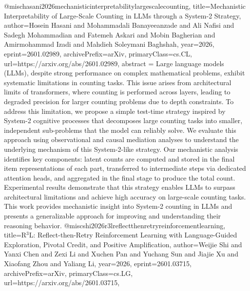 {}@misc{hasani2026mechanisticinterpretabilitylargescalecounting,
      title={Mechanistic Interpretability of Large-Scale Counting in LLMs through a System-2 Strategy}, 
      author={Hosein Hasani and Mohammadali Banayeeanzade and Ali Nafisi and Sadegh Mohammadian and Fatemeh Askari and Mobin Bagherian and Amirmohammad Izadi and Mahdieh Soleymani Baghshah},
      year={2026},
      eprint={2601.02989},
      archivePrefix={arXiv},
      primaryClass={cs.CL},
      url={https://arxiv.org/abs/2601.02989},
      abstract = {Large language models (LLMs), despite strong performance on complex mathematical problems, exhibit systematic limitations in counting tasks. This issue arises from architectural limits of transformers, where counting is performed across layers, leading to degraded precision for larger counting problems due to depth constraints. To address this limitation, we propose a simple test-time strategy inspired by System-2 cognitive processes that decomposes large counting tasks into smaller, independent sub-problems that the model can reliably solve. We evaluate this approach using observational and causal mediation analyses to understand the underlying mechanism of this System-2-like strategy. Our mechanistic analysis identifies key components: latent counts are computed and stored in the final item representations of each part, transferred to intermediate steps via dedicated attention heads, and aggregated in the final stage to produce the total count. Experimental results demonstrate that this strategy enables LLMs to surpass architectural limitations and achieve high accuracy on large-scale counting tasks. This work provides mechanistic insight into System-2 counting in LLMs and presents a generalizable approach for improving and understanding their reasoning behavior.}
}@misc{shi2026r3lreflectthenretryreinforcementlearning,
      title={R$^3$L: Reflect-then-Retry Reinforcement Learning with Language-Guided Exploration, Pivotal Credit, and Positive Amplification}, 
      author={Weijie Shi and Yanxi Chen and Zexi Li and Xuchen Pan and Yuchang Sun and Jiajie Xu and Xiaofang Zhou and Yaliang Li},
      year={2026},
      eprint={2601.03715},
      archivePrefix={arXiv},
      primaryClass={cs.LG},
      url={https://arxiv.org/abs/2601.03715},
}
